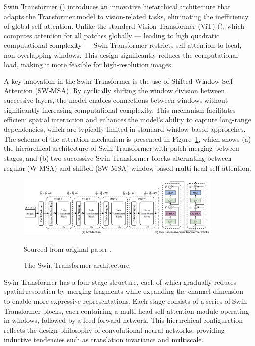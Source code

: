 \documentclass[a4paper,11pt,twoside]{report}
\theoremstyle{definition}
\begin{document}
Swin Transformer (\cite{swin}) introduces an innovative hierarchical architecture that adapts the Transformer model to vision-related tasks, eliminating the inefficiency of global self-attention. Unlike the standard Vision Transformer (ViT) (\cite{vit}), which computes attention for all patches globally — leading to high quadratic computational complexity — Swin Transformer restricts self-attention to local, non-overlapping windows. This design significantly reduces the computational load, making it more feasible for high-resolution images.

A key innovation in the Swin Transformer is the use of Shifted Window Self-Attention (SW-MSA). By cyclically shifting the window division between successive layers, the model enables connections between windows without significantly increasing computational complexity. This mechanism facilitates efficient spatial interaction and enhances the model’s ability to capture long-range dependencies, which are typically limited in standard window-based approaches. The schema of the attention mechanism is presented in Figure~\ref{fig:swin}, which shows (a) the hierarchical architecture of Swin Transformer with patch merging between stages, and (b) two successive Swin Transformer blocks alternating between regular (W-MSA) and shifted (SW-MSA) window-based multi-head self-attention.


\begin{figure}
  \centering
  \includegraphics[width=0.9\textwidth]{img_methodology/swin.png}
  \caption{The Swin Transformer architecture.}
  \footnotesize{Sourced from original paper \cite{swin}.}
  \label{fig:swin}
\end{figure}

Swin Transformer has a four-stage structure, each of which gradually reduces spatial resolution by merging fragments while expanding the channel dimension to enable more expressive representations. Each stage consists of a series of Swin Transformer blocks, each containing a multi-head self-attention module operating in windows, followed by a feed-forward network. This hierarchical configuration reflects the design philosophy of convolutional neural networks, providing inductive tendencies such as translation invariance and multiscale.
\end{document}
